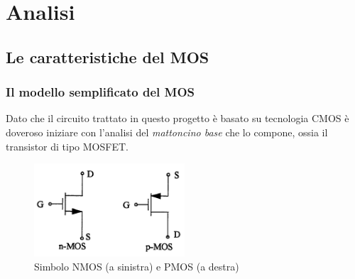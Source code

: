 
\chapter{Analisi} %
\label{Chapter2}

\section{Le caratteristiche del MOS}
\label{sec:caratteristicheMos}

\subsection{Il modello semplificato del MOS}
\label{sec:sec_mos}

Dato che il circuito trattato in questo progetto è basato su tecnologia CMOS è doveroso iniziare con l'analisi del \textit{mattoncino base} che lo compone, ossia il transistor di tipo MOSFET.

\begin{figure}[hbt!]
	\centering
	\includegraphics[width=0.5\textwidth]{figure/simboliMos.png}
	\caption{Simbolo NMOS (a sinistra) e PMOS (a destra)}
	\label{fig:simboliMos}
\end{figure}

